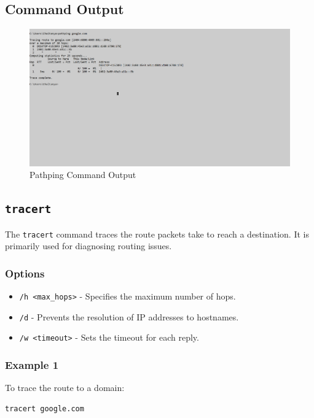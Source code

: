 \documentclass{article}
\begin{document}
\subsection{Command Output}
\begin{figure}[htbp]
    \centering
    \includegraphics[]{pathping.png}
    \caption{Pathping Command Output}
    \label{fig:pathping_output}
\end{figure}
\clearpage  %
\subsection{\texttt{tracert}}
The \texttt{tracert} command traces the route packets take to reach a destination. It is primarily used for diagnosing routing issues.

\subsubsection{Options}
\begin{itemize}
    \item \texttt{/h \textless max\_hops\textgreater} - Specifies the maximum number of hops.
    \item \texttt{/d} - Prevents the resolution of IP addresses to hostnames.
    \item \texttt{/w \textless timeout\textgreater} - Sets the timeout for each reply.
\end{itemize}

\subsubsection{Example 1}
To trace the route to a domain:
\begin{verbatim}
tracert google.com
\end{verbatim}
\end{document}
